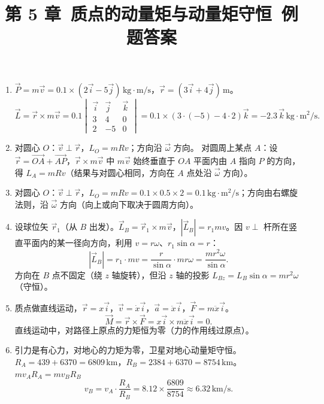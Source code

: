 \documentclass[12pt]{article}
\title{第 5 章\ 质点的动量矩与动量矩守恒\ 例题答案}
\author{}
\date{}
\begin{document}
\maketitle

\begin{enumerate}[label=\textbf{例\arabic*.}, leftmargin=*]

\item $\vec{P} = m\vec{v} = 0.1 \times (2\vec{i} - 5\vec{j})\,\mathrm{kg\cdot m/s}$，$\vec{r} = (3\vec{i} + 4\vec{j})\,\mathrm{m}$。
\[
  \vec{L} = \vec{r}\times m\vec{v} = 0.1\begin{vmatrix} \vec{i} & \vec{j} & \vec{k} \\ 3 & 4 & 0 \\ 2 & -5 & 0 \end{vmatrix} = 0.1 \times (3 \cdot (-5) - 4 \cdot 2)\vec{k} = -2.3\,\vec{k}\,\mathrm{kg\cdot m^2/s}.
\]

\item 对圆心 $O$：$\vec{v}\perp\vec{r}$，$L_O = mRv$；方向沿 $\vec{\omega}$ 方向。
对圆周上某点 $A$：设 $\vec{r} = \vec{OA} + \vec{AP}$，$\vec{r}\times m\vec{v}$ 中 $m\vec{v}$ 始终垂直于 $OA$ 平面内由 $A$ 指向 $P$ 的方向，得 $L_A = mRv$（结果与对圆心相同，方向在 $A$ 点处沿 $\vec{\omega}$ 方向）。

\item 对圆心 $O$：$\vec{v}\perp\vec{r}$，$L_O = mRv = 0.1 \times 0.5 \times 2 = 0.1\,\mathrm{kg\cdot m^2/s}$；方向由右螺旋法则，沿 $\vec{\omega}$ 方向（向上或向下取决于圆周方向）。

\item 设球位矢 $\vec{r}_1$（从 $B$ 出发）。$\vec{L}_B = \vec{r}_1\times m\vec{v}$，$|\vec{L}_B| = r_1 mv$。因 $v\perp$ 杆所在竖直平面内的某一径向方向，利用 $v = r\omega$、$r_1\sin\alpha = r$：
\[
  |\vec{L}_B| = r_1 \cdot mv = \frac{r}{\sin\alpha} \cdot m r\omega = \frac{mr^2\omega}{\sin\alpha}.
\]
方向在 $B$ 点不固定（绕 $z$ 轴旋转），但沿 $z$ 轴的投影 $L_{Bz} = L_B\sin\alpha = mr^2\omega$（守恒）。

\item 质点做直线运动，$\vec{r} = x\vec{i}$，$\vec{v} = \dot{x}\vec{i}$，$\vec{a} = \ddot{x}\vec{i}$，$\vec{F} = m\ddot{x}\vec{i}$。
\[
  \vec{M} = \vec{r}\times\vec{F} = x\vec{i}\times m\ddot{x}\vec{i} = 0.
\]
直线运动中，对路径上原点的力矩恒为零（力的作用线过原点）。

\item 引力是有心力，对地心的力矩为零，卫星对地心动量矩守恒。
$R_A = 439 + 6370 = 6809\,\mathrm{km}$，$R_B = 2384 + 6370 = 8754\,\mathrm{km}$。
$mv_A R_A = mv_B R_B$
\[
  v_B = v_A \cdot \frac{R_A}{R_B} = 8.12 \times \frac{6809}{8754} \approx 6.32\,\mathrm{km/s}.
\]


\end{enumerate}
\end{document}
